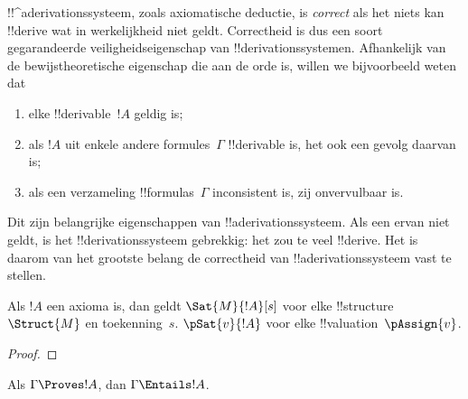 \documentclass[openany]{memoir}
\begin{document}
\begin{explain}
!!^a{derivation}ssysteem, zoals axiomatische deductie, is \emph{correct}
als het niets kan !!{derive} wat in werkelijkheid niet geldt.
Correctheid is dus een soort gegarandeerde veiligheidseigenschap van
!!{derivation}ssystemen. Afhankelijk van de bewijstheoretische
eigenschap die aan de orde is, willen we bijvoorbeeld weten dat
\begin{enumerate}
\item elke !!{derivable}~$!A$ geldig is;
\item als $!A$ uit enkele andere formules~$\Gamma$ !!{derivable} is,
  het ook een gevolg daarvan is;
\item als een verzameling !!{formula}s~$\Gamma$ inconsistent is, zij
  onvervulbaar is.
\end{enumerate}
Dit zijn belangrijke eigenschappen van !!a{derivation}ssysteem. Als
een ervan niet geldt, is het !!{derivation}ssysteem gebrekkig: het zou
te veel !!{derive}. Het is daarom van het grootste belang de
correctheid van !!a{derivation}ssysteem vast te stellen.
\end{explain}

\begin{prop}
  Als $!A$ een axioma is, dan geldt
    {$\Sat{M}{!A}[s]$ voor elke !!{structure}~$\Struct{M}$ en toekenning~$s$.}
    {$\pSat{v}{!A}$ voor elke !!{valuation}~$\pAssign{v}$.}
\end{prop}

\begin{proof}
\end{proof}

\begin{thm}[Correctheid]
Als $\Gamma \Proves !A$, dan $\Gamma \Entails !A$.
\end{thm}
\end{document}
